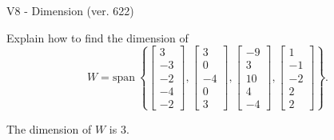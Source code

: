 \begin{exercise}
  \begin{exerciseTitle}V8 - Dimension (ver. 622)\end{exerciseTitle}
  \begin{exerciseStatement}
    Explain how to find the dimension of 
\[W=\mathrm{span}\ \left\{\left[\begin{array}{r}
3 \\
-3 \\
-2 \\
-4 \\
-2
\end{array}\right] , \left[\begin{array}{r}
3 \\
0 \\
-4 \\
0 \\
3
\end{array}\right] , \left[\begin{array}{r}
-9 \\
3 \\
10 \\
4 \\
-4
\end{array}\right] , \left[\begin{array}{r}
1 \\
-1 \\
-2 \\
2 \\
2
\end{array}\right]\right\}.\]



  \end{exerciseStatement}
  \begin{exerciseAnswer}
   The dimension of \(W\) is  \(3\).
  


  \end{exerciseAnswer}
\end{exercise}